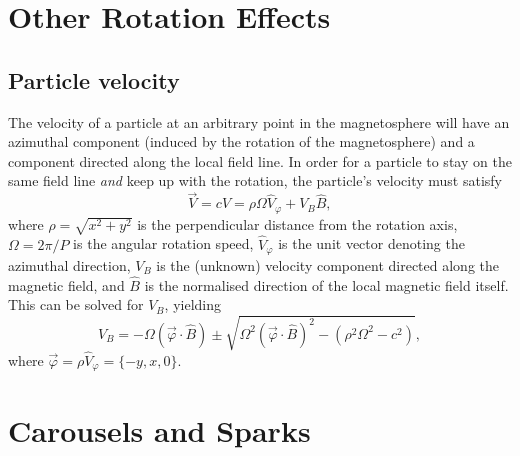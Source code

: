 \documentclass{article}
\newcommand{\phase}{\varphi}
\begin{document}
\section{Other Rotation Effects}
\label{sec:rotation}

\subsection{Particle velocity}

The velocity of a particle at an arbitrary point in the magnetosphere will have an azimuthal component (induced by the rotation of the magnetosphere) and a component directed along the local field line.
In order for a particle to stay on the same field line \emph{and} keep up with the rotation, the particle's velocity must satisfy
\begin{equation}
    \vec{V} = c\hat{V} = \rho\Omega\hat{V}_\phase + V_B\hat{B},
\end{equation}
where $\rho = \sqrt{x^2 + y^2}$ is the perpendicular distance from the rotation axis, $\Omega = 2\pi/P$ is the angular rotation speed, $\hat{V}_\phase$ is the unit vector denoting the azimuthal direction, $V_B$ is the (unknown) velocity component directed along the magnetic field, and $\hat{B}$ is the normalised direction of the local magnetic field itself.
This can be solved for $V_B$, yielding
\begin{equation}
    V_B = -\Omega(\vec{\phase}\cdot\hat{B}) \pm \sqrt{\Omega^2(\vec{\phase}\cdot\hat{B})^2 - (\rho^2\Omega^2-c^2)},
\end{equation}
where $\vec{\phase} = \rho\hat{V}_\phase = \{-y,x,0\}$.

\section{Carousels and Sparks}
\label{sec:carousel}
\end{document}
